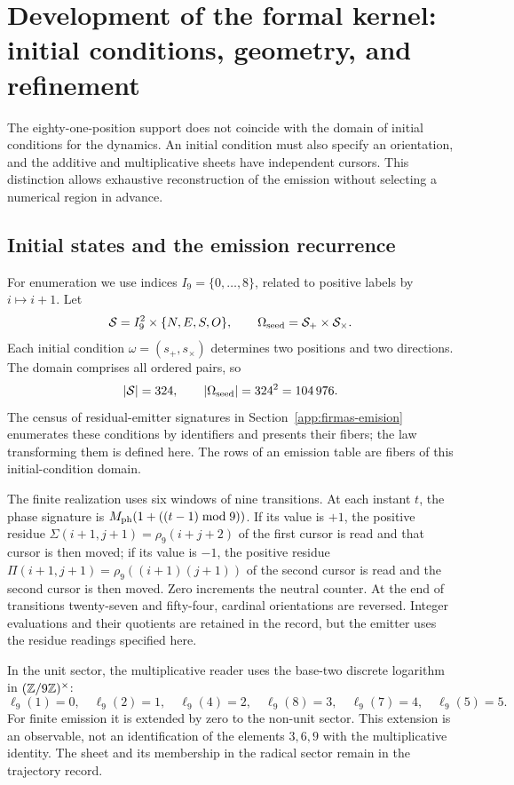 \section{Development of the formal kernel: initial conditions, geometry, and refinement}
\label{sec:extension}

The eighty-one-position support does not coincide with the domain of initial conditions for the dynamics. An initial condition must also specify an orientation, and the additive and multiplicative sheets have independent cursors. This distinction allows exhaustive reconstruction of the emission without selecting a numerical region in advance.

\subsection{Initial states and the emission recurrence}

For enumeration we use indices \(I_9=\{0,\ldots,8\}\), related to positive labels by \(i\mapsto i+1\). Let
\[
 \mathcal S=I_9^2\times\{N,E,S,O\},\qquad
 \Omega_{\rm seed}=\mathcal S_+\times\mathcal S_\times.
\]
Each initial condition \(\omega=(s_+,s_\times)\) determines two positions and two directions. The domain comprises all ordered pairs, so
\begin{equation}
 |\mathcal S|=324,\qquad |\Omega_{\rm seed}|=324^2=104\,976.
 \label{eq:semillas}
\end{equation}
The census of residual-emitter signatures in Section~\ref{app:firmas-emision} enumerates these conditions by identifiers and presents their fibers; the law transforming them is defined here. The rows of an emission table are fibers of this initial-condition domain.

The finite realization uses six windows of nine transitions. At each instant \(t\), the phase signature is \(M_{\rm ph}(1+((t-1)\bmod9))\). If its value is \(+1\), the positive residue \(\Sigma(i+1,j+1)=\rho_9(i+j+2)\) of the first cursor is read and that cursor is then moved; if its value is \(-1\), the positive residue \(\Pi(i+1,j+1)=\rho_9((i+1)(j+1))\) of the second cursor is read and the second cursor is then moved. Zero increments the neutral counter. At the end of transitions twenty-seven and fifty-four, cardinal orientations are reversed. Integer evaluations and their quotients are retained in the record, but the emitter uses the residue readings specified here.

In the unit sector, the multiplicative reader uses the base-two discrete logarithm in \((\mathbb Z/9\mathbb Z)^\times\):
\[
 \ell_9(1)=0,\quad\ell_9(2)=1,\quad\ell_9(4)=2,\quad
 \ell_9(8)=3,\quad\ell_9(7)=4,\quad\ell_9(5)=5.
\]
For finite emission it is extended by zero to the non-unit sector. This extension is an observable, not an identification of the elements \(3,6,9\) with the multiplicative identity. The sheet and its membership in the radical sector remain in the trajectory record.

